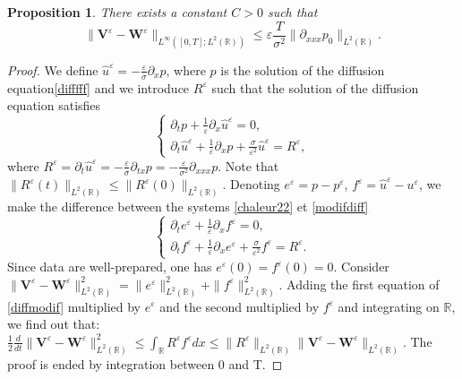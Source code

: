\documentclass[a4paper,french,english,10pt]{article}
\newcommand\eps{\varepsilon}
\newcommand{\dt}{\partial_t}
\newcommand\V{\mathbf{V}}
\newcommand\W{\mathbf{W}}
\newtheorem{proposition}[theorem]{Proposition}
\begin{document}
\begin{proposition} \label{heqtode}
There exists a constant $C>0$ such that 
\begin{equation*}
\|\V^{\eps}-\W^\eps\|_{L^\infty([0,T];L^2(\mathbb{R}) )} \leq
 \eps \frac{T}{\sigma^2} \|\partial_{xxx}p_0\|_{L^2(\mathbb{R})}.
\end{equation*}
\end{proposition}
\begin{proof}
We define $\widehat{u}^{\eps}=-\frac{\varepsilon}\sigma \partial_x p$, where $p$ is the solution of the diffusion equation\eqref{difffff} and we
introduce $R^{\eps}$ such that the solution of the diffusion equation satisfies
\begin{equation}\label{modifdiff}
\left \{
\begin{array}{lll}
\dt p +\frac{1}{\eps}\partial_{x}\widehat{u}^{\eps}=0,\\
\partial_t \widehat{u}^{\eps} + \frac{1}{\eps}\partial_x p +\frac{\sigma}{\eps^2}\widehat{u}^{\eps} = R^{\eps},
\end{array}
\right.
\end{equation}
where
 $R^{\eps}=\dt \widehat{u}^{\eps}=-\frac{\varepsilon}\sigma \partial_{tx} p =
-\frac{\varepsilon}{\sigma^2} \partial_{xxx}p$. 
Note that 
$\|R^{\eps}(t)\|_{L^2(\mathbb{R})}\leq \|R^{\eps}(0)\|_{L^2(\mathbb{R})}$. 
Denoting $e^{\eps}=p-p^{\eps}$, $f^{\eps}=\widehat{u}^{\eps}-u^{\eps}$, we make the difference between the
systems \eqref{chaleur22} et \eqref{modifdiff}
\begin{equation}\label{diffmodif}
\left \{
\begin{array}{lll}
\dt e^{\eps} +\frac{1}{\eps}\partial_{x}f^{\eps}=0,\\
\partial_t f^{\eps} +\frac{1}{\eps}\partial_x e^{\eps} +\frac{\sigma}{\eps^2}f^{\eps} = R^{\eps}.
\end{array}
\right.
\end{equation}
Since data are well-prepared, one has $e^{\eps}(0)=f^{\eps}(0)=0$.
Consider
$\|\V^{\eps}-\W^\eps\|_{L^2(\mathbb{R})}^2=\|e^{\eps}\|_{L^2(\mathbb{R})}
^2+\|f^{\eps}\|_{L^2(\mathbb{R})}^2$.
Adding the first equation of
\eqref{diffmodif} multiplied by $e^{\eps}$ and the second multiplied by $f^{\eps}$ and integrating
on $\mathbb{R}$,
 we find out that:
$\frac12 \frac{d}{dt}\|\V^{\eps}-\W^\eps\|_{L^2(\mathbb{R})}^2 \leq
\int_{\mathbb{R}}R^{\eps}f^{\eps} dx \leq  \|R^{\eps}\|_{L^2(\mathbb{R})}
\|\V^{\eps}-\W^\eps\|_{L^2(\mathbb{R})}
.$
  The proof is ended by integration between 0 and T.

\end{proof}
\end{document}
